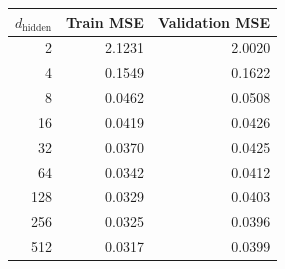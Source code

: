 \begin{tabular}{rrr}
\toprule
$d_{\mathrm{hidden}}$ & Train MSE & Validation MSE \\
\midrule
2 & 2.1231 & 2.0020 \\
4 & 0.1549 & 0.1622 \\
8 & 0.0462 & 0.0508 \\
16 & 0.0419 & 0.0426 \\
32 & 0.0370 & 0.0425 \\
64 & 0.0342 & 0.0412 \\
128 & 0.0329 & 0.0403 \\
256 & 0.0325 & 0.0396 \\
512 & 0.0317 & 0.0399 \\
\bottomrule
\end{tabular}
